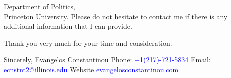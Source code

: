 \documentclass[12pt]{letter}
\begin{document}
\begin{letter}{Department of Politics,\\
Princeton University.}
Please do not hesitate to contact me if there is any additional information that I can provide.

Thank you very much for your time and consideration.


\noindent Sincerely,
\newline\noindent Evangelos Constantinou
\vspace{4mm}
\newline\noindent Phone: \textcolor{blue}{+1(217)-721-5834}
\newline\noindent Email: \textcolor{blue}{ecnstnt2@illinois.edu}
\newline\noindent Website \textcolor{blue}{evangelosconstantinou.com}
\end{letter}
\end{document}
